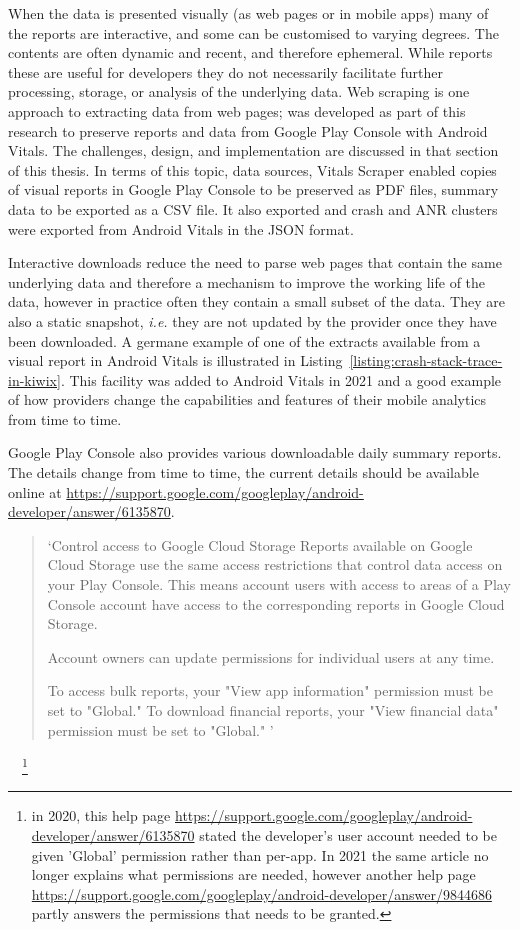 When the data is presented visually (as web pages or in mobile apps) many of the reports are interactive, and some can be customised to varying degrees. The contents are often dynamic and recent, and therefore ephemeral. While reports these are useful for developers they do not necessarily facilitate further processing, storage, or analysis of the underlying data. Web scraping is one approach to extracting data from web pages; \href{section-vitals-scraper}{} was developed as part of this research to preserve reports and data from Google Play Console with Android Vitals. The challenges, design, and implementation are discussed in that section of this thesis. In terms of this topic, data sources, Vitals Scraper enabled copies of visual reports in Google Play Console to be preserved as PDF files, summary data to be exported as a CSV file. It also exported and crash and ANR clusters were exported from Android Vitals in the JSON format.

Interactive downloads reduce the need to parse web pages that contain the same underlying data and therefore a mechanism to improve the working life of the data, however in practice often they contain a small subset of the data. They are also a static snapshot, \textit{i.e.} they are not updated by the provider once they have been downloaded. A germane example of one of the extracts available from a visual report in Android Vitals is illustrated in Listing~\ref{listing:crash-stack-trace-in-kiwix}. This facility was added to Android Vitals in 2021 and a good example of how providers change the capabilities and features of their mobile analytics from time to time.

Google Play Console also provides various downloadable daily summary reports. The details change from time to time, the current details should be available online at \url{https://support.google.com/googleplay/android-developer/answer/6135870}.

{\footnotesize
\begin{quote}
    `Control access to Google Cloud Storage
    Reports available on Google Cloud Storage use the same access restrictions that control data access on your Play Console. This means account users with access to areas of a Play Console account have access to the corresponding reports in Google Cloud Storage.
    
    Account owners can update permissions for individual users at any time.
    
        To access bulk reports, your "View app information" permission must be set to "Global."
        To download financial reports, your "View financial data" permission must be set to "Global." '
\end{quote}}~\citep{google_play_download_and_export_monthly_reports}~\footnote{in 2020, this help page  \url{https://support.google.com/googleplay/android-developer/answer/6135870} stated the developer's user account needed to be given 'Global' permission rather than per-app. In 2021 the same article no longer explains what permissions are needed, however another help page \url{https://support.google.com/googleplay/android-developer/answer/9844686} partly answers the permissions that needs to be granted.}

